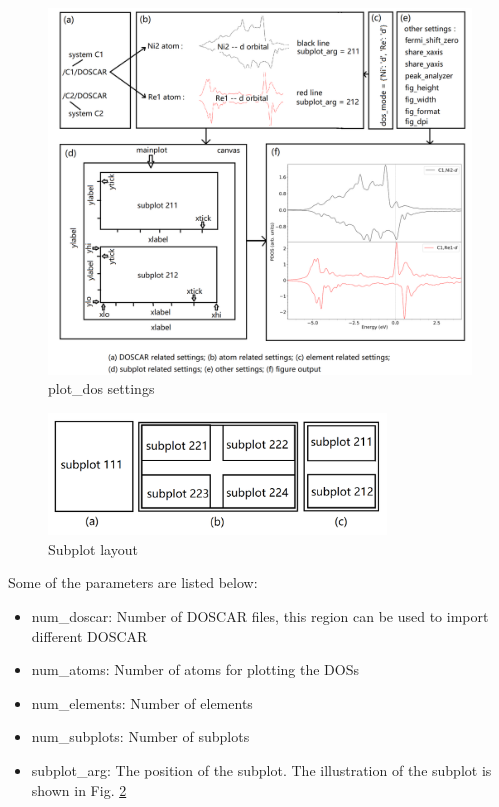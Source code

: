 \documentclass[12pt]{book}
\begin{document}
\begin{figure}[htbp]
\centering
\includegraphics[width=1.0\textwidth]{plot_dos_illustration.pdf}
\caption{plot\_dos settings}
\label{fig:FigureLayout}
\end{figure}

\begin{figure}[htbp]
\centering
\includegraphics[width=0.8\textwidth]{subplot_layout.pdf}
\caption{Subplot layout}
\label{fig:SubplotArg1}
\end{figure}

Some of the parameters are listed below:
\begin{itemize}
\item num\_doscar: Number of DOSCAR files, this region can be used to import different DOSCAR
\item num\_atoms: Number of atoms for plotting the DOSs
\item num\_elements: Number of elements
\item num\_subplots: Number of subplots
\item subplot\_arg: The position of the subplot. The illustration of the subplot is shown in Fig. \ref{fig:SubplotArg1}
\end{itemize}
\end{document}
